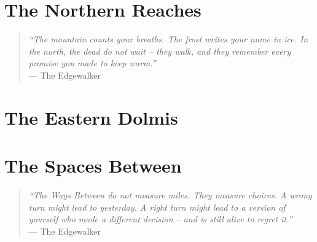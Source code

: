 \documentclass[12pt,oneside]{book}
\begin{document}
\newpage

\newpage

\newpage

\newpage

\newpage

\newpage


\part{The Northern Reaches}

\begin{quote}
  \small
  \textit{``The mountain counts your breaths. The frost writes your name in ice. In the north, the dead do not wait -- they walk, and they remember every promise you made to keep warm.''}
  \\ --- The Edgewalker
\end{quote}

\newpage

\newpage

\newpage

\newpage

\newpage

\newpage


\part{The Eastern Dolmis}


\newpage

\newpage

\newpage


\part{The Spaces Between}

\begin{quote}
  \small
  \textit{``The Ways Between do not measure miles. They measure choices. A wrong turn might lead to yesterday. A right turn might lead to a version of yourself who made a different decision -- and is still alive to regret it.''}
  \\ --- The Edgewalker
\end{quote}
\end{document}
